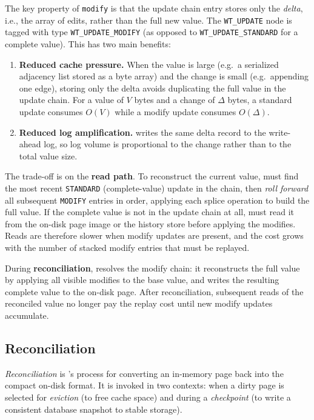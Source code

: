 The key property of \texttt{modify} is that the update chain entry stores only
the \emph{delta}, i.e., the array of edits, rather than the full new value.
The \texttt{WT\_UPDATE} node is tagged with type \texttt{WT\_UPDATE\_MODIFY} (as opposed to \texttt{WT\_UPDATE\_STANDARD} for a complete value).
This has two main benefits:

\begin{enumerate}
  \item \textbf{Reduced cache pressure.}  When the value is large (e.g.\ a
    serialized adjacency list stored as a byte array) and the change is small
    (e.g.\ appending one edge), storing only the delta avoids duplicating the
    full value in the update chain.  For a value of $V$ bytes and a change of
    $\Delta$ bytes, a standard update consumes $O(V)$ while a modify update
    consumes $O(\Delta)$.

  \item \textbf{Reduced log amplification.}  \wt{} writes the same delta
    record to the write-ahead log, so log volume is proportional to the
    change rather than to the total value size.
\end{enumerate}

The trade-off is on the \textbf{read path}.
To reconstruct the current value, \wt{} must find the most recent \texttt{STANDARD} (complete-value) update in the chain, then \emph{roll forward} all subsequent \texttt{MODIFY} entries in order, applying each splice operation to build the full value.
If the complete value is not in the update chain at all, \wt{} must read it from the on-disk page image or the history store before applying the modifies.
Reads are therefore slower when modify updates are present, and the cost grows
with the number of stacked modify entries that must be replayed.

During \textbf{reconciliation}, \wt{} resolves the modify chain: it
reconstructs the full value by applying all visible modifies to the base value,
and writes the resulting complete value to the on-disk page.
After reconciliation, subsequent reads of the reconciled value no longer pay the
replay cost until new modify updates accumulate.

\subsection{Reconciliation}
\label{sec:wt-reconcile}

\emph{Reconciliation} is \wt{}'s process for converting an in-memory page back into the compact on-disk format.
It is invoked in two contexts: when a dirty page is selected for \emph{eviction} (to free cache space) and during a \emph{checkpoint} (to write a consistent database snapshot to stable storage).

